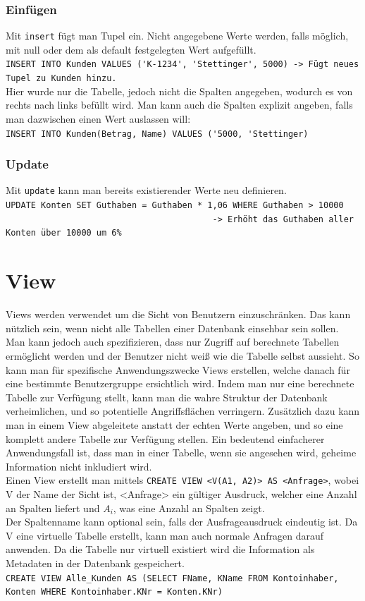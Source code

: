 \documentclass{article}
\begin{document}
	\subsubsection{Einfügen}
	Mit \verb|insert| fügt man Tupel ein. Nicht angegebene Werte werden, falls möglich, mit null oder dem als default festgelegten Wert aufgefüllt. \\
	\verb|INSERT INTO Kunden VALUES ('K-1234', 'Stettinger', 5000) -> Fügt neues Tupel zu Kunden hinzu.| \\
	Hier wurde nur die Tabelle, jedoch nicht die Spalten angegeben, wodurch es von rechts nach links befüllt wird. Man kann auch die Spalten explizit angeben, falls man dazwischen einen Wert auslassen will: \\
	\verb|INSERT INTO Kunden(Betrag, Name) VALUES ('5000, 'Stettinger)|
	\subsubsection{Update}
	Mit \verb|update| kann man bereits existierender Werte neu definieren. \\
	\verb|UPDATE Konten SET Guthaben = Guthaben * 1,06 WHERE Guthaben > 10000| \\
	\verb|                                         -> Erhöht das Guthaben aller Konten über 10000 um 6%|
	\section{View}
	Views werden verwendet um die Sicht von Benutzern einzuschränken. Das kann nützlich sein, wenn nicht alle Tabellen einer Datenbank einsehbar sein sollen. Man kann jedoch auch spezifizieren, dass nur Zugriff auf berechnete Tabellen ermöglicht werden und der Benutzer nicht weiß wie die Tabelle selbst aussieht. So kann man für spezifische Anwendungszwecke Views erstellen, welche danach für eine bestimmte Benutzergruppe ersichtlich wird. Indem man nur eine berechnete Tabelle zur Verfügung stellt, kann man die wahre Struktur der Datenbank verheimlichen, und so potentielle Angriffsflächen verringern. Zusätzlich dazu kann man in einem View abgeleitete anstatt der echten Werte angeben, und so eine komplett andere Tabelle zur Verfügung stellen. Ein bedeutend einfacherer Anwendungsfall ist, dass man in einer Tabelle, wenn sie angesehen wird, geheime Information nicht inkludiert wird. \\
	Einen View erstellt man mittels \verb|CREATE VIEW <V(A1, A2)> AS <Anfrage>|, wobei V der Name der Sicht ist, <Anfrage> ein gültiger Ausdruck, welcher eine Anzahl an Spalten liefert und $A_i$, was eine Anzahl an Spalten zeigt. \\
	Der Spaltenname kann optional sein, falls der Ausfrageausdruck eindeutig ist. Da V eine virtuelle Tabelle erstellt, kann man auch normale Anfragen darauf anwenden. Da die Tabelle nur virtuell existiert wird die Information als Metadaten in der Datenbank gespeichert. \\
	\verb|CREATE VIEW Alle_Kunden AS (SELECT FName, KName FROM Kontoinhaber, Konten WHERE Kontoinhaber.KNr = Konten.KNr)|
\end{document}
